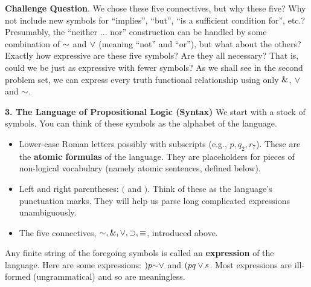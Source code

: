 \documentclass[options]{philosophersimprint}
\theoremstyle{definition}
\begin{document}
\textbf{Challenge Question}. We chose these five connectives, but why these five? Why not include new symbols for ``implies'', ``but'', ``is a sufficient condition for'', etc.? Presumably, the ``neither ... nor'' construction can be handled by some combination of $\mathord{\sim}$ and $\mathbin{\vee}$ (meaning ``not'' and ``or''), but what about the others? Exactly how expressive are these five symbols? Are they all necessary? That is, could we be just as expressive with fewer symbols? As we shall see in the second problem set, we can express every truth functional relationship using only $\mathbin{\&}$, $\mathbin{\vee}$ and $\mathord{\sim}$.

\textbf{3. The Language of Propositional Logic (Syntax)} We start with a stock of symbols. You can think of these symbols as the alphabet of the language.
\begin{itemize}
    \item Lower-case Roman letters possibly with subscripts (e.g., $p, q_2, r_7$). These are the \textbf{atomic formulas} of the language. They are placeholders for pieces of non-logical vocabulary (namely atomic sentences, defined below).
    \item Left and right parentheses: $($ and $)$. Think of these as the language's punctuation marks. They will help us parse long complicated expressions unambiguously.
    \item The five connectives, $\mathord{\sim}, \mathbin{\&}, \mathbin{\vee}, \mathbin{\supset}, \mathbin{\equiv}$, introduced above.
\end{itemize}

Any finite string of the foregoing symbols is called an \textbf{expression} of the language. Here are some expressions: \quad $)p\mathord{\sim}\mathbin{\vee}$ \quad and \quad $(pq\mathbin{\vee} s$. Most expressions are ill-formed (ungrammatical) and so are meaningless.
\end{document}
